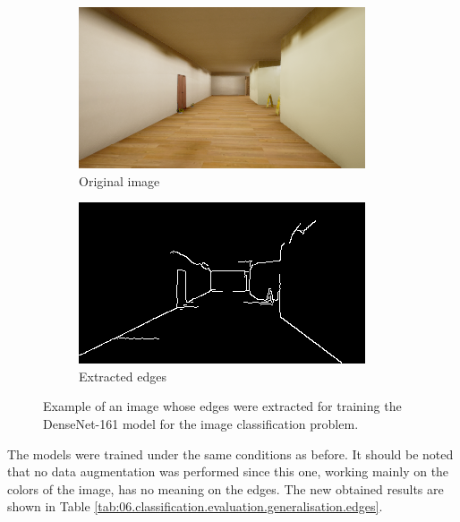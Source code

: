 \begin{figure}[H]
    \centering
    \begin{subfigure}{0.49\textwidth}
        \centering
        \includegraphics[width=\textwidth]{resources/png/06/classification/edges/original.png}
        \caption{Original image}
    \end{subfigure}
    \hfill
    \begin{subfigure}{0.49\textwidth}
        \centering
        \includegraphics[width=\textwidth]{resources/png/06/classification/edges/edges.png}
        \caption{Extracted edges}
    \end{subfigure}
    \caption{Example of an image whose edges were extracted for training the DenseNet-161 model for the image classification problem.}
    \label{fig:06.classification.edges}
\end{figure}

The models were trained under the same conditions as before. It should be noted that no data augmentation was performed since this one, working mainly on the colors of the image, has no meaning on the edges. The new obtained results are shown in Table \ref{tab:06.classification.evaluation.generalisation.edges}.


